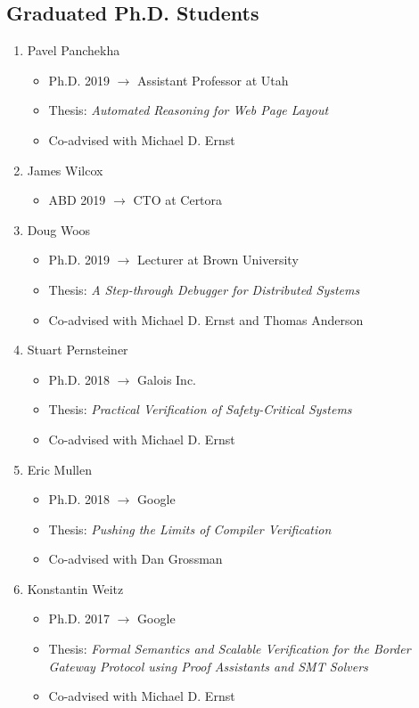 \documentclass[10pt]{article}
\begin{document}
\subsection*{Graduated Ph.D. Students}

\begin{enumerate}[resume]
  \item Pavel Panchekha
    \begin{itemize}
      \item Ph.D. 2019 $\rightarrow$ Assistant Professor at Utah
      \item Thesis: \textit{Automated Reasoning for Web Page Layout}
      \item Co-advised with Michael D. Ernst
    \end{itemize}

  \item James Wilcox
    \begin{itemize}
      \item ABD 2019 $\rightarrow$ CTO at Certora
    \end{itemize}

  \item Doug Woos
    \begin{itemize}
      \item Ph.D. 2019 $\rightarrow$ Lecturer at Brown University
      \item Thesis: \textit{A Step-through Debugger for Distributed Systems}
      \item Co-advised with Michael D. Ernst and Thomas Anderson
    \end{itemize}

  \item Stuart Pernsteiner
    \begin{itemize}
      \item Ph.D. 2018 $\rightarrow$ Galois Inc.
      \item Thesis: \textit{Practical Verification of Safety-Critical Systems}
      \item Co-advised with Michael D. Ernst
    \end{itemize}

  \item Eric Mullen
    \begin{itemize}
      \item Ph.D. 2018 $\rightarrow$ Google
      \item Thesis: \textit{Pushing the Limits of Compiler Verification}
      \item Co-advised with Dan Grossman
    \end{itemize}

  \item Konstantin Weitz
    \begin{itemize}
      \item Ph.D. 2017 $\rightarrow$ Google
      \item Thesis: \textit{Formal Semantics and Scalable Verification for the Border Gateway Protocol using Proof Assistants and SMT Solvers}
      \item Co-advised with Michael D. Ernst
    \end{itemize}
\end{enumerate}
\end{document}
